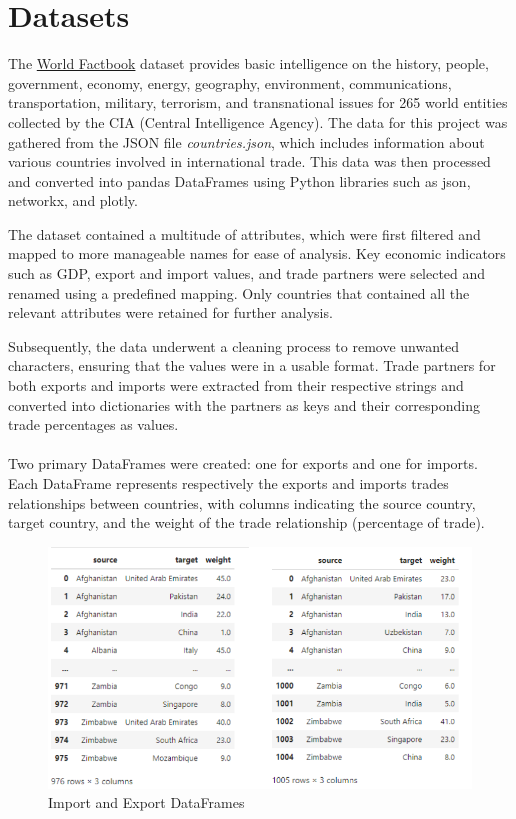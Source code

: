 \documentclass[12pt, a4paper]{article}
\begin{document}
\section{Datasets}
\label{datasets}
The \href{https://www.kaggle.com/datasets/lucafrance/the-world-factbook-by-cia}{World Factbook} dataset provides basic intelligence on the history, people, government, economy, energy, geography, environment, communications, transportation, military, terrorism, and transnational issues for 265 world entities collected by the CIA (Central Intelligence Agency). The data for this project was gathered from the JSON file \textit{countries.json}, which includes information about various countries involved in international trade. This data was then processed and converted into pandas DataFrames using Python libraries such as json, networkx, and plotly.

The dataset contained a multitude of attributes, which were first filtered and mapped to more manageable names for ease of analysis. Key economic indicators such as GDP, export and import values, and trade partners were selected and renamed using a predefined mapping. Only countries that contained all the relevant attributes were retained for further analysis.

Subsequently, the data underwent a cleaning process to remove unwanted characters, ensuring that the values were in a usable format. Trade partners for both exports and imports were extracted from their respective strings and converted into dictionaries with the partners as keys and their corresponding trade percentages as values.
\\
\\Two primary DataFrames were created: one for exports and one for imports. Each DataFrame represents respectively the exports and imports trades relationships between countries, with columns indicating the source country, target country, and the weight of the trade relationship (percentage of trade).

\begin{figure}[ht]
\centering
\includegraphics[scale=0.4]{img/import_export.drawio.png}
\captionsetup{font=scriptsize,labelfont=bf}
\caption{Import and Export DataFrames}
\label{fig:dataframes}
\end{figure}
\end{document}
